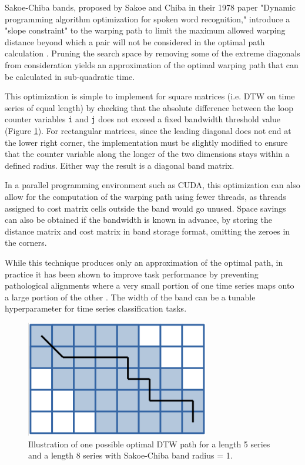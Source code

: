 \documentclass[12pt, letterpaper]{article}
\begin{document}
Sakoe-Chiba bands, proposed by Sakoe and Chiba in their 1978 paper "Dynamic
programming algorithm optimization for spoken word recognition," introduce a
"slope constraint" to the warping path to limit the maximum allowed warping
distance beyond which a pair will not be considered in the optimal path
calculation \cite{sakoe_dynamic_1978}. Pruning the search space by removing some
of the extreme diagonals from consideration yields an approximation of the
optimal warping path that can be calculated in sub-quadratic time.

This optimization is simple to implement for square matrices (i.e. DTW on time
series of equal length) by checking that the absolute difference between the
loop counter variables \verb|i| and \verb|j| does not exceed a fixed bandwidth
threshold value (Figure \ref{sakoe_chiba}). For rectangular matrices, since the
leading diagonal does not end at the lower right corner, the implementation must
be slightly modified to ensure that the counter variable along the longer of the
two dimensions stays within a defined radius. Either way the result is a
diagonal band matrix.

In a parallel programming environment such as CUDA, this optimization can also
allow for the computation of the warping path using fewer threads, as threads
assigned to cost matrix cells outside the band would go unused. Space savings
can also be obtained if the bandwidth is known in advance, by storing the
distance matrix and cost matrix in band storage format, omitting the zeroes
in the corners.

While this technique produces only an approximation of the optimal path, in
practice it has been shown to improve task performance by preventing
pathological alignments where a very small portion of one time series maps onto
a large portion of the other \cite{keogh_exact_2002}. The width of the band
can be a tunable hyperparameter for time series classification tasks.

\begin{figure}[htbp]
\includegraphics[height=2in]{img/sakoe_chiba.png}
\centering
\caption{Illustration of one possible optimal DTW path for a length 5 series and
a length 8 series with Sakoe-Chiba band radius = 1.}
\label{sakoe_chiba}
\end{figure}
\end{document}
